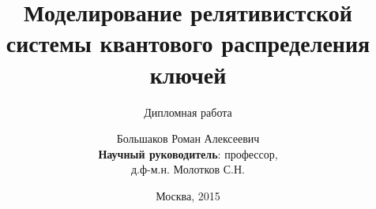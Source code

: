 \documentclass[aspectratio=43]{beamer}
\begin{document}
\title{Моделирование релятивистской системы квантового распределения ключей}
\subtitle{Дипломная работа}
\author{Большаков Роман Алексеевич\\ 
\textbf{Научный руководитель}: профессор,\\ д.ф-м.н. Молотков С.Н. }
\date{Москва, 2015}
\maketitle

% 
\end{document}

